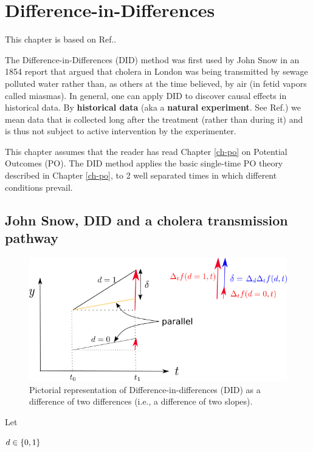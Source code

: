 \chapter{Difference-in-Differences}
\label{ch-did}

This chapter is based on
Ref.\cite{book-mixtape}.


The Difference-in-Differences (DID)
method was first used by John Snow
in an 1854 report that
argued that 
cholera in London
was being transmitted 
by sewage polluted water
rather than, as others
at the time believed, by air (in fetid vapors
called miasmas).
In general, one can
apply DID to discover 
causal effects in historical data.
By {\bf historical data} (aka a {\bf natural
experiment}. See Ref.\cite{wiki-nat-exp})
we mean data that is collected long
after the treatment (rather than during it)
 and is thus
not  subject to 
active intervention
by the experimenter. 

This chapter assumes that the
reader has read Chapter \ref{ch-po}
on Potential Outcomes (PO).
The DID method
applies the basic single-time
PO theory described in Chapter \ref{ch-po},
to 2
well separated times
in which
different conditions prevail.



\section{John Snow, DID  
and a cholera
transmission pathway}


\begin{figure}[h!]
\centering
\includegraphics[width=5in]
{did/dif-dif.png}
\caption{Pictorial representation of
 Difference-in-differences (DID) as a difference
of two differences (i.e., 
a difference of two slopes).} 
\label{fig-dif-dif}
\end{figure}

Let

$d\in \{0,1\}$

